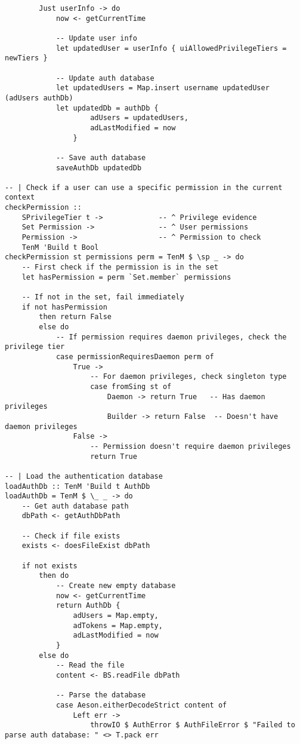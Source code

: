 \documentclass{article}
\begin{document}
\begin{tcolorbox}[title=Ten/Daemon/Auth.hs Changes]
\begin{verbatim}
        Just userInfo -> do
            now <- getCurrentTime

            -- Update user info
            let updatedUser = userInfo { uiAllowedPrivilegeTiers = newTiers }

            -- Update auth database
            let updatedUsers = Map.insert username updatedUser (adUsers authDb)
            let updatedDb = authDb {
                    adUsers = updatedUsers,
                    adLastModified = now
                }

            -- Save auth database
            saveAuthDb updatedDb

-- | Check if a user can use a specific permission in the current context
checkPermission ::
    SPrivilegeTier t ->             -- ^ Privilege evidence
    Set Permission ->               -- ^ User permissions
    Permission ->                   -- ^ Permission to check
    TenM 'Build t Bool
checkPermission st permissions perm = TenM $ \sp _ -> do
    -- First check if the permission is in the set
    let hasPermission = perm `Set.member` permissions

    -- If not in the set, fail immediately
    if not hasPermission
        then return False
        else do
            -- If permission requires daemon privileges, check the privilege tier
            case permissionRequiresDaemon perm of
                True ->
                    -- For daemon privileges, check singleton type
                    case fromSing st of
                        Daemon -> return True   -- Has daemon privileges
                        Builder -> return False  -- Doesn't have daemon privileges
                False ->
                    -- Permission doesn't require daemon privileges
                    return True

-- | Load the authentication database
loadAuthDb :: TenM 'Build t AuthDb
loadAuthDb = TenM $ \_ _ -> do
    -- Get auth database path
    dbPath <- getAuthDbPath

    -- Check if file exists
    exists <- doesFileExist dbPath

    if not exists
        then do
            -- Create new empty database
            now <- getCurrentTime
            return AuthDb {
                adUsers = Map.empty,
                adTokens = Map.empty,
                adLastModified = now
            }
        else do
            -- Read the file
            content <- BS.readFile dbPath

            -- Parse the database
            case Aeson.eitherDecodeStrict content of
                Left err ->
                    throwIO $ AuthError $ AuthFileError $ "Failed to parse auth database: " <> T.pack err


\end{verbatim}
\end{tcolorbox}
\end{document}
